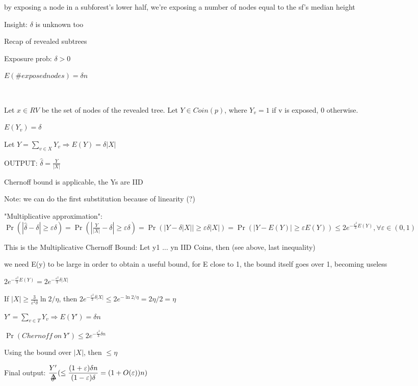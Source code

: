 \documentclass{report}
\begin{document}
	by exposing a node in a subforest's lower half, we're exposing a number of nodes equal to the sf's median height
	
	
	
	
	Insight: $\delta$ is unknown too
	
	Recap of revealed subtrees
	
	Exposure prob: $\delta > 0$
	
	$E(\# exposed nodes) = \delta n$
	
	\
	
	Let $x \in RV$ be the set of nodes of the revealed tree. Let $Y \in Coin(p)$, where $Y_v = 1$ if v is exposed, 0 otherwise.
	
	$E(Y_v) = \delta$
	
	Let $ Y = \sum_{v \in X} Y_v \Rightarrow E(Y)= \delta |X|$
	
	OUTPUT: $\hat\delta = \frac{Y}{|X|}$
	
	Chernoff bound is applicable, the Ys are IID
	
	Note: we can do the first substitution because of linearity (?)
	
	"Multiplicative approximation": $\displaystyle \Pr(|\hat\delta - \delta| \geq \varepsilon \delta) = \Pr(|\frac{Y}{|X|} - \delta| \geq \varepsilon \delta) = \Pr(|Y - \delta |X|| \geq \varepsilon \delta |X|) = \Pr(|Y - E(Y)| \geq \varepsilon E(Y)) \leq 2e^{-\frac{\varepsilon^2}{3}E(Y)}, \forall \varepsilon \in (0, 1)$
	
	This is the Multiplicative Chernoff Bound: Let y1 ... yn IID Coins, then (see above, last inequality)
	
	we need E(y) to be large in order to obtain a useful bound, for E close to 1, the bound itself goes over 1, becoming useless
	
	$\displaystyle 2e^{-\frac{\varepsilon^2}{3}E(Y)} = 2e^{-\frac{\varepsilon^2}{3}\delta|X|}$
	
	If $\displaystyle |X| \geq \frac{3}{\varepsilon^2\delta}\ln2/\eta$, then $\displaystyle 2e^{-\frac{\varepsilon^2}{3}\delta|X|} \leq 2e^{-\ln2/\eta} = 2\eta/2 = \eta$
	
	$Y' = \sum_{v \in T}Y_v \Rightarrow E(Y') = \delta n$
	
	$\Pr(Chernoff\ on\ Y') \leq 2e^{-\frac{\varepsilon^2}{3}\delta n}$
	
	Using the bound over $|X|$, then $\leq \eta$
	
	Final output: $\displaystyle \frac{Y'}{\mathaccent 1 \delta } (\leq  \frac{(1 + \varepsilon)\delta n}{(1 - \varepsilon)\delta} = (1+O(\varepsilon))n )$
	
\end{document}
